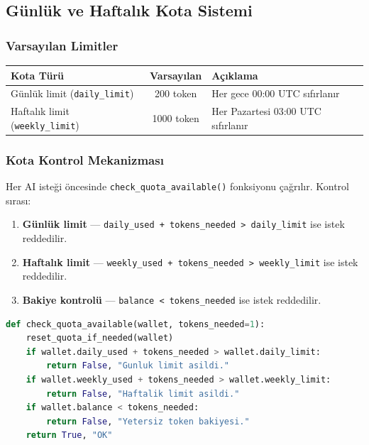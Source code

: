 \documentclass[12pt,a4paper]{article}
\begin{document}
\subsection{G\"{u}nl\"{u}k ve Haftal{\i}k Kota Sistemi}

\subsubsection{Varsay{\i}lan Limitler}
\begin{center}
\begin{tabular}{|l|c|l|}
\hline
\textbf{Kota T\"{u}r\"{u}} & \textbf{Varsay{\i}lan} & \textbf{A\c{c}{\i}klama} \\
\hline
G\"{u}nl\"{u}k limit (\texttt{daily\_limit})   & 200 token  & Her gece 00:00 UTC s{\i}f{\i}rlan{\i}r \\
Haftal{\i}k limit (\texttt{weekly\_limit}) & 1000 token & Her Pazartesi 03:00 UTC s{\i}f{\i}rlan{\i}r \\
\hline
\end{tabular}
\end{center}

\subsubsection{Kota Kontrol Mekanizmas{\i}}
Her AI iste\u{g}i \"{o}ncesinde \texttt{check\_quota\_available()} fonksiyonu \c{c}a\u{g}r{\i}l{\i}r.
Kontrol s{\i}ras{\i}:

\begin{enumerate}
  \item \textbf{G\"{u}nl\"{u}k limit} --- \texttt{daily\_used + tokens\_needed > daily\_limit} ise istek reddedilir.
  \item \textbf{Haftal{\i}k limit} --- \texttt{weekly\_used + tokens\_needed > weekly\_limit} ise istek reddedilir.
  \item \textbf{Bakiye kontrol\"{u}} --- \texttt{balance < tokens\_needed} ise istek reddedilir.
\end{enumerate}

\begin{lstlisting}[language=Python, caption={Kota kontrol fonksiyonu}]
def check_quota_available(wallet, tokens_needed=1):
    reset_quota_if_needed(wallet)
    if wallet.daily_used + tokens_needed > wallet.daily_limit:
        return False, "Gunluk limit asildi."
    if wallet.weekly_used + tokens_needed > wallet.weekly_limit:
        return False, "Haftalik limit asildi."
    if wallet.balance < tokens_needed:
        return False, "Yetersiz token bakiyesi."
    return True, "OK"
\end{lstlisting}
\end{document}
